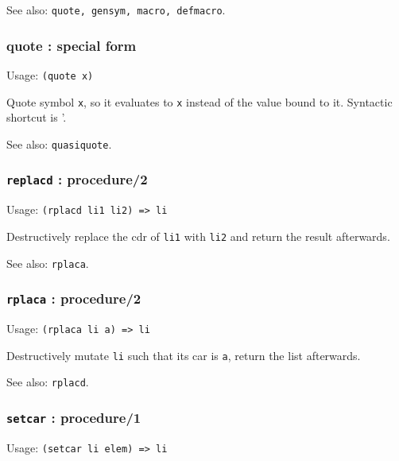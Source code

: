 \documentclass[
]{article}
\newcommand{\passthrough}[1]{#1}
\begin{document}
See also: \passthrough{\lstinline!quote, gensym, macro, defmacro!}.

\hypertarget{quote-special-form}{%
\subsubsection{quote : special form}\label{quote-special-form}}

Usage: \passthrough{\lstinline!(quote x)!}

Quote symbol \passthrough{\lstinline!x!}, so it evaluates to
\passthrough{\lstinline!x!} instead of the value bound to it. Syntactic
shortcut is '.

See also: \passthrough{\lstinline!quasiquote!}.

\hypertarget{replacd-procedure2}{%
\subsubsection{\texorpdfstring{\texttt{replacd} :
procedure/2}{replacd : procedure/2}}\label{replacd-procedure2}}

Usage: \passthrough{\lstinline!(rplacd li1 li2) => li!}

Destructively replace the cdr of \passthrough{\lstinline!li1!} with
\passthrough{\lstinline!li2!} and return the result afterwards.

See also: \passthrough{\lstinline!rplaca!}.

\hypertarget{rplaca-procedure2}{%
\subsubsection{\texorpdfstring{\texttt{rplaca} :
procedure/2}{rplaca : procedure/2}}\label{rplaca-procedure2}}

Usage: \passthrough{\lstinline!(rplaca li a) => li!}

Destructively mutate \passthrough{\lstinline!li!} such that its car is
\passthrough{\lstinline!a!}, return the list afterwards.

See also: \passthrough{\lstinline!rplacd!}.

\hypertarget{setcar-procedure1}{%
\subsubsection{\texorpdfstring{\texttt{setcar} :
procedure/1}{setcar : procedure/1}}\label{setcar-procedure1}}

Usage: \passthrough{\lstinline!(setcar li elem) => li!}
\end{document}
